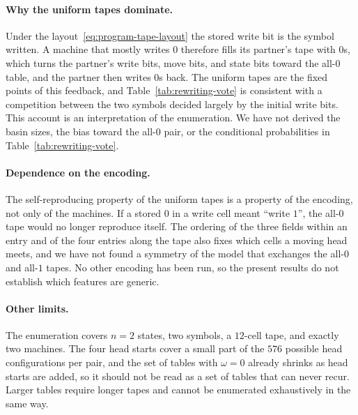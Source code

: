 \documentclass{article}
\begin{document}
\paragraph{Why the uniform tapes dominate.}
Under the layout~\eqref{eq:program-tape-layout} the stored write bit is
the symbol written.  A machine that mostly writes $0$ therefore fills its
partner's tape with $0$s, which turns the partner's write bits, move bits,
and state bits toward the all-$0$ table, and the partner then writes $0$s
back.  The uniform tapes are the fixed points of this feedback, and
Table~\ref{tab:rewriting-vote} is consistent with a competition between
the two symbols decided largely by the initial write bits.  This account
is an interpretation of the enumeration.  We have not derived the basin
sizes, the bias toward the all-$0$ pair, or the conditional probabilities
in Table~\ref{tab:rewriting-vote}.

\paragraph{Dependence on the encoding.}
The self-reproducing property of the uniform tapes is a property of the
encoding, not only of the machines.  If a stored $0$ in a write cell meant
``write $1$'', the all-$0$ tape would no longer reproduce itself.  The
ordering of the three fields within an entry and of the four entries along
the tape also fixes which cells a moving head meets, and we have not
found a symmetry of the model that exchanges the all-$0$ and all-$1$
tapes.  No other
encoding has been run, so the present results do not establish which
features are generic.

\paragraph{Other limits.}
The enumeration covers $n=2$ states, two symbols, a $12$-cell tape, and
exactly two machines.  The four head starts cover a small part of the
$576$ possible head configurations per pair, and the set of tables with
$\omega=0$ already shrinks as head starts are added, so it should not be
read as a set of tables that can never recur.  Larger tables require longer tapes and cannot be
enumerated exhaustively in the same way.
\end{document}
